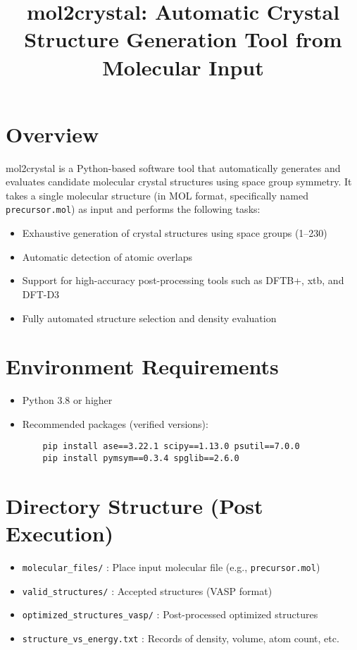 \documentclass[12pt]{article}
\title{mol2crystal: Automatic Crystal Structure Generation Tool from Molecular Input}
\author{}
\date{}
\begin{document}
\maketitle

\section{Overview}
mol2crystal is a Python-based software tool that automatically generates and evaluates candidate molecular crystal structures using space group symmetry. It takes a single molecular structure (in MOL format, specifically named \texttt{precursor.mol}) as input and performs the following tasks:
\begin{itemize}
    \item Exhaustive generation of crystal structures using space groups (1--230)
    \item Automatic detection of atomic overlaps
    \item Support for high-accuracy post-processing tools such as DFTB+, xtb, and DFT-D3
    \item Fully automated structure selection and density evaluation
\end{itemize}

\section{Environment Requirements}
\begin{itemize}
    \item Python 3.8 or higher
    \item Recommended packages (verified versions):
    \begin{verbatim}
    pip install ase==3.22.1 scipy==1.13.0 psutil==7.0.0
    pip install pymsym==0.3.4 spglib==2.6.0
    \end{verbatim}
\end{itemize}

\section{Directory Structure (Post Execution)}
\begin{itemize}
    \item \texttt{molecular\_files/} : Place input molecular file (e.g., \texttt{precursor.mol})
    \item \texttt{valid\_structures/} : Accepted structures (VASP format)
    \item \texttt{optimized\_structures\_vasp/} : Post-processed optimized structures
    \item \texttt{structure\_vs\_energy.txt} : Records of density, volume, atom count, etc.
\end{itemize}
\end{document}
